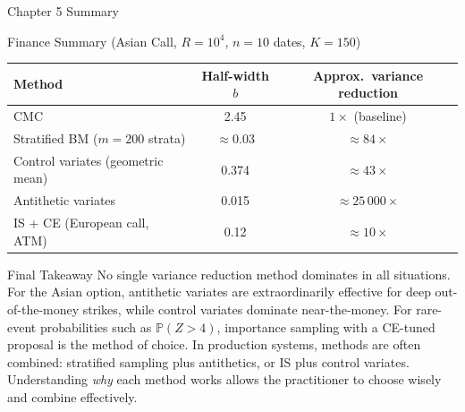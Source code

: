 \documentclass[aspectratio=169,10pt]{beamer}
\begin{document}
\begin{frame}[allowframebreaks]{Chapter 5 Summary}
\begin{block}{Finance Summary (Asian Call, $R = 10^4$, $n = 10$ dates, $K = 150$)}
  \begin{center}\small
    \begin{tabular}{lcc}
      \toprule
      Method & Half-width $b$ & Approx.\ variance reduction \\
      \midrule
      CMC & 2.45 & $1\times$ (baseline) \\
      Stratified BM ($m = 200$ strata) & $\approx 0.03$ & $\approx 84\times$ \\
      Control variates (geometric mean) & 0.374 & $\approx 43\times$ \\
      Antithetic variates & 0.015 & $\approx 25\,000\times$ \\
      IS + CE (European call, ATM) & 0.12 & $\approx 10\times$ \\
      \bottomrule
    \end{tabular}
  \end{center}
\end{block}

\begin{alertblock}{Final Takeaway}
  No single variance reduction method dominates in all situations.  For the
  Asian option, antithetic variates are extraordinarily effective for deep
  out-of-the-money strikes, while control variates dominate near-the-money.
  For rare-event probabilities such as $\mathbb{P}(Z > 4)$, importance sampling
  with a CE-tuned proposal is the method of choice.  In production systems,
  methods are often combined: stratified sampling plus antithetics, or IS plus
  control variates.  Understanding \emph{why} each method works allows the
  practitioner to choose wisely and combine effectively.
\end{alertblock}

\end{frame}
\end{document}
